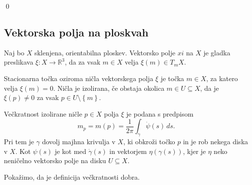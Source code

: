  \qed



\subsection{Vektorska polja na ploskvah} 

\begin{definicija}
\label{def_vektorsko_polje}
Naj bo $X$ sklenjena, orientabilna ploskev. Vektorsko polje $xi$ na $X$ je gladka preslikava $\xi: X \to  \mathbb{R}^3$, da za vsak $m \in  X$ velja $\xi(m) \in  T_mX$.
\end{definicija}

\begin{definicija}
\label{def_stacionarna_tocka_vektorskega_polja}
Stacionarna točka oziroma ničla vektorskega polja $\xi$ je točka $m \in  X$, za katero velja $\xi(m) = 0$. Ničla je izolirana, če obstaja okolica $m \in  U \subseteq X$, da je $\xi(p) \neq 0$ za vsak $p \in  U \setminus \left\{ m\right\} $.
\end{definicija}

\begin{definicija}
\label{def_veckratnost_izolirane_nicle}
Večkratnost izolirane ničle $p \in  X$ polja $\xi$ je podana s predpisom \begin{equation*}
m_p = m(p) = \frac{1}{2\pi} \int_{\gamma} \dot{\psi}(s) \, ds. 
\end{equation*}  
Pri tem je $\gamma$ dovolj majhna krivulja v $X$, ki obkroži točko $p$ in je rob nekega diska v $X$. Kot $\psi(s)$ je kot med
$\dot{\gamma}(s)$ in vektorjem $\eta(\gamma(s))$, kjer je $\eta$ neko neničelno vektorsko polje na disku $U \subseteq X$.  
\end{definicija}



Pokažimo, da je definicija večkratnosti dobra. 


